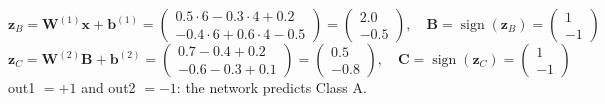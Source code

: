 \documentclass[11pt,addpoints]{exam}
\begin{document}
\begin{questions}
\begin{parts}
\begin{solution}
\[\]
\[
\bm{z}_B = \bm{W}^{(1)} \bm{x} + \bm{b}^{(1)}
= \begin{pmatrix} 0.5 \cdot 6 - 0.3 \cdot 4 + 0.2 \\ -0.4 \cdot 6 + 0.6 \cdot 4 - 0.5 \end{pmatrix}
= \begin{pmatrix} 2.0 \\ -0.5 \end{pmatrix}, \quad
\bm{B} = \operatorname{sign}(\bm{z}_B) = \begin{pmatrix} 1 \\ -1 \end{pmatrix}
\]
\[
\bm{z}_C = \bm{W}^{(2)} \bm{B} + \bm{b}^{(2)}
= \begin{pmatrix} 0.7 - 0.4 + 0.2 \\ -0.6 - 0.3 + 0.1 \end{pmatrix}
= \begin{pmatrix} 0.5 \\ -0.8 \end{pmatrix}, \quad
\bm{C} = \operatorname{sign}(\bm{z}_C) = \begin{pmatrix} 1 \\ -1 \end{pmatrix}
\]
out1 $= +1$ and out2 $= -1$: the network predicts Class A.
\end{solution}


\end{parts}
\end{questions}
\end{document}
